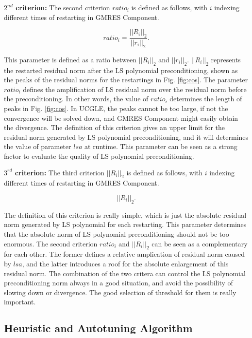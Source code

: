 \textbf{$2^{nd}$ criterion:} The second criterion $ratio_i$ is defined as follows, with $i$ indexing different times of restarting in GMRES Component.

\begin{equation}
ratio_i=\frac{||R_i||_2}{||r_{i}||_2}.
\end{equation}

This parameter is defined as a ratio between $||R_i||_2$ and $||r_i||_2$. $||R_i||_2$ represents the restarted residual norm after the LS polynomial preconditioning, shown as the peaks of the residual norms for the restartings in Fig. \ref{fig:cos}.  The parameter $ratio_i$ defines the amplification of LS residual norm over the residual norm before the preconditioning. In other words,  the value of $ratio_i$ determines the length of peaks in Fig. \ref{fig:cos}. In UCGLE, the peaks cannot be too large, if not the convergence will be solved down, and GMRES Component might easily obtain the divergence. The definition of this criterion gives an upper limit for the residual norm generated by LS polynomial preconditioning, and it will determines the value of parameter $lsa$ at runtime. This parameter can be seen as a strong factor to evaluate the quality of LS polynomial preconditioning.


\textbf{$3^{rd}$ criterion:} The third criterion $||R_i||_2$ is defined as follows, with $i$ indexing different times of restarting in GMRES Component.

\begin{equation}
||R_i||_2.
\end{equation}

The definition of this criterion is really simple, which is just the absolute residual norm generated by LS polynomial for each restarting. This parameter determines that the absolute norm of LS polynomial preconditioning should not be too enormous. The second criterion $ratio_i$ and  $||R_i||_2$ can be seen as a complementary for each other. The former defines a relative amplication of residual norm caused by $lsa$, and the latter introduces a roof for the absolute enlargement of this residual norm. The combination of the two critera can control the LS polynomial preconditioning norm always in a good situation, and avoid the possibility of slowing down or divergence. The good selection of threshold for them is really important.

\subsection{Heuristic and Autotuning Algorithm}

